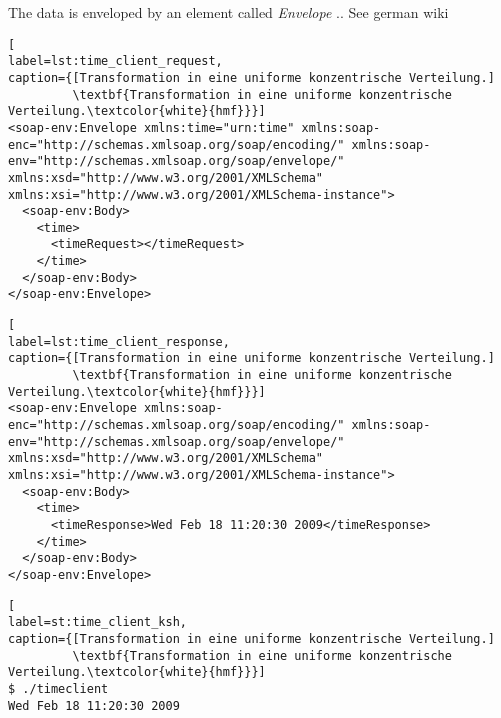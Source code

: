 The data is enveloped by an element called \textit{Envelope} .. See german wiki

\begin{minipage}[t]{\textwidth}
\begin{lstlisting}[
label=lst:time_client_request,
caption={[Transformation in eine uniforme konzentrische Verteilung.]
         \textbf{Transformation in eine uniforme konzentrische Verteilung.\textcolor{white}{hmf}}}]
<soap-env:Envelope xmlns:time="urn:time" xmlns:soap-enc="http://schemas.xmlsoap.org/soap/encoding/" xmlns:soap-env="http://schemas.xmlsoap.org/soap/envelope/" xmlns:xsd="http://www.w3.org/2001/XMLSchema" xmlns:xsi="http://www.w3.org/2001/XMLSchema-instance">
  <soap-env:Body>
    <time>
      <timeRequest></timeRequest>
    </time>
  </soap-env:Body>
</soap-env:Envelope>
\end{lstlisting}
\end{minipage}


\begin{minipage}[t]{\textwidth}
\begin{lstlisting}[
label=lst:time_client_response,
caption={[Transformation in eine uniforme konzentrische Verteilung.]
         \textbf{Transformation in eine uniforme konzentrische Verteilung.\textcolor{white}{hmf}}}]
<soap-env:Envelope xmlns:soap-enc="http://schemas.xmlsoap.org/soap/encoding/" xmlns:soap-env="http://schemas.xmlsoap.org/soap/envelope/" xmlns:xsd="http://www.w3.org/2001/XMLSchema" xmlns:xsi="http://www.w3.org/2001/XMLSchema-instance">
  <soap-env:Body>
    <time>
      <timeResponse>Wed Feb 18 11:20:30 2009</timeResponse>
    </time>
  </soap-env:Body>
</soap-env:Envelope>
\end{lstlisting}
\end{minipage}




\begin{minipage}[t]{\textwidth}
\begin{lstlisting}[
label=st:time_client_ksh,
caption={[Transformation in eine uniforme konzentrische Verteilung.]
         \textbf{Transformation in eine uniforme konzentrische Verteilung.\textcolor{white}{hmf}}}]
$ ./timeclient
Wed Feb 18 11:20:30 2009
\end{lstlisting}
\end{minipage}












